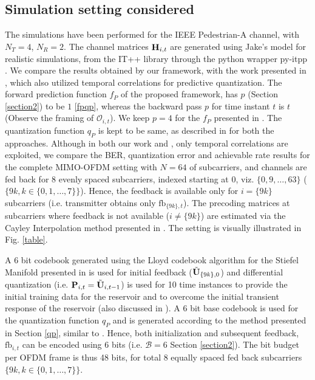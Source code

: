 \documentclass[conference]{IEEEtran}
\begin{document}
\subsection{Simulation setting considered}
\label{setting}
\noindent The simulations have been performed for the IEEE Pedestrian-A channel, with $N_T=4$, $N_R=2$.  The channel matrices ${\bf H}_{i,t}$ are generated using Jake's model for realistic simulations, from the IT++ library through the python wrapper py-itpp \cite{ViditPy}. 
We compare the results obtained by our framework, with the work presented in \cite{6891198}, which also utilized temporal correlations for predictive quantization.
The forward prediction function $f_P$ of the proposed framework, has $p$ (Section \ref{section2}) to be $1$ \eqref{fpqp}, whereas the backward pass $p$ for time instant $t$ is $t$ (Observe the framing of $\mathcal{O}_{i,t}$).   
We keep $p=4$ for the $f_P$ presented in \cite{6891198}.
The quantization function $q_P$ is kept to be same, as described in \cite{6545375,6891198,Gupt1905:Predictive} for both the approaches.
Although in both our work and \cite{6891198}, only temporal correlations are exploited, we compare the BER, quantization error and achievable rate results for the complete MIMO-OFDM setting with $N=64$ of subcarriers, and channels are fed back for $8$ evenly spaced subcarriers, indexed starting at 0, viz. $\{0,9,\ldots,63\}$ ($\{9k, k \in \{0,1,\ldots,7\}\}$). Hence, the feedback is available only for $i=\{9k\}$ subcarriers (i.e. transmitter obtains only $\text{fb}_{\{9k\},t}$).
The precoding matrices at subcarriers where feedback is not available ($i\neq\{9k\}$) are estimated via the Cayley Interpolation method presented in \cite{Gupt1905:Predictive}.
The setting is visually illustrated in Fig. \ref{table}.

A 6 bit codebook generated using the Lloyd codebook algorithm for the Stiefel Manifold presented in \cite{6678348} is used for initial feedback ($\tilde{{\bf U}}_{\{9k\},0}$) and differential quantization (i.e. ${\bf P}_{i,t}=\tilde{{\bf U}}_{i,t-1}$) is used for 10 time instances to provide the initial training data for the reservoir and to overcome the initial transient response of the reservoir (also discussed in \cite{mosleh2017brain}).
A 6 bit base codebook is used for the quantization function $q_P$ and is generated according to the method presented in Section \ref{qp}, similar to \cite{Gupt1905:Predictive}.
Hence, both initialization and subsequent feedback, $\text{fb}_{i,t}$ can be encoded using 6 bits (i.e. $\mathcal{B}=6$ Section \ref{section2}).
The bit budget per OFDM frame is thus 48 bits, for total 8 equally spaced fed back subcarriers $\{9k, k \in \{0,1,\ldots,7\}\}$.
\end{document}

